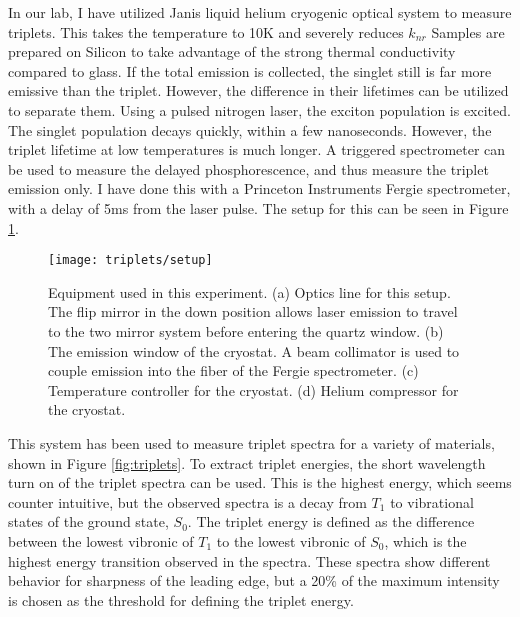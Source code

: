 \documentclass[../thesis.tex]{subfiles}
\begin{document}
In our lab, I have utilized Janis liquid helium cryogenic optical system to measure triplets.
This takes the temperature to 10K and severely reduces $k_{nr}$
Samples are prepared on Silicon to take advantage of the strong thermal conductivity compared to glass.
If the total emission is collected, the singlet still is far more emissive than the triplet.
However, the difference in their lifetimes can be utilized to separate them.
Using a pulsed nitrogen laser, the exciton population is excited. 
The singlet population decays quickly, within a few nanoseconds.
However, the triplet lifetime at low temperatures is much longer.
A triggered spectrometer can be used to measure the delayed phosphorescence, and thus measure the triplet emission only.
I have done this with a Princeton Instruments Fergie spectrometer, with a delay of 5ms from the laser pulse.
The setup for this can be seen in Figure \ref{fig:triplets_setup}.

\begin{figure}[ht]
\centering
\texttt{[image: triplets/setup]}
\caption{Equipment used in this experiment.  (a) Optics line for this setup.  The flip mirror in the down position allows laser emission to travel to the two mirror system before entering the quartz window. (b) The emission window of the cryostat.  A beam collimator is used to couple emission into the fiber of the Fergie spectrometer.  (c) Temperature controller for the cryostat.  (d) Helium compressor for the cryostat.}
\label{fig:triplets_setup}
\end{figure}

This system has been used to measure triplet spectra for a variety of materials, shown in Figure \ref{fig:triplets}.
To extract triplet energies, the short wavelength turn on of the triplet spectra can be used.  
This is the highest energy, which seems counter intuitive, but the observed spectra is a decay from $T_1$ to vibrational states of the ground state, $S_0$. 
The triplet energy is defined as the difference between the lowest vibronic of $T_1$ to the lowest vibronic of $S_0$, which is the highest energy transition observed in the spectra.
These spectra show different behavior for sharpness of the leading edge, but a 20\% of the maximum intensity is chosen as the threshold for defining the triplet energy.


\end{document}

